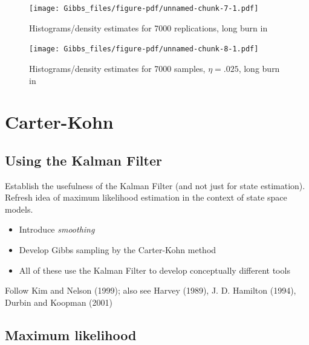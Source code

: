 \documentclass[
  letterpaper,
]{book}
\providecommand{\tightlist}{%
  \setlength{\itemsep}{0pt}\setlength{\parskip}{0pt}}\usepackage{longtable,booktabs,array}
\begin{document}
\begin{figure}

{\centering \texttt{[image: Gibbs\_files/figure-pdf/unnamed-chunk-7-1.pdf]}

}

\caption{Histograms/density estimates for 7000 replications, long burn
in}

\end{figure}

\begin{figure}

{\centering \texttt{[image: Gibbs\_files/figure-pdf/unnamed-chunk-8-1.pdf]}

}

\caption{Histograms/density estimates for 7000 samples, \(\eta=.025\),
long burn in}

\end{figure}

\hypertarget{carter-kohn}{%
\chapter{Carter-Kohn}\label{carter-kohn}}

\hypertarget{using-the-kalman-filter}{%
\section{Using the Kalman Filter}\label{using-the-kalman-filter}}

Establish the usefulness of the Kalman Filter (and not just for state
estimation). Refresh idea of maximum likelihood estimation in the
context of state space models.

\begin{itemize}
\tightlist
\item
  Introduce \emph{smoothing}
\item
  Develop Gibbs sampling by the Carter-Kohn method
\item
  All of these use the Kalman Filter to develop conceptually different
  tools
\end{itemize}

Follow Kim and Nelson (1999); also see Harvey (1989), J. D. Hamilton
(1994), Durbin and Koopman (2001)

\hypertarget{maximum-likelihood}{%
\section{Maximum likelihood}\label{maximum-likelihood}}
\end{document}
